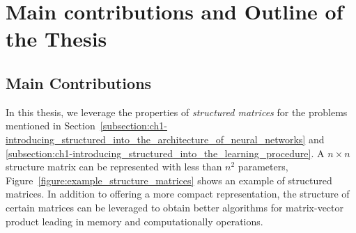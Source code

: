 \section{Main contributions and Outline of the Thesis}
\label{section:ch1-main_contributions_and_outline_of_the_thesis}

\subsection{Main Contributions}
\label{subsection:ch1-main_contributions}

In this thesis, we leverage the properties of \emph{structured matrices} for the problems mentioned in Section~\ref{subsection:ch1-introducing_structured_into_the_architecture_of_neural_networks} and \ref{subsection:ch1-introducing_structured_into_the_learning_procedure}. A $n \times n$ structure matrix can be represented with less than $n^2$ parameters, Figure~\ref{figure:example_structure_matrices} shows an example of structured matrices.
In addition to offering a more compact representation, the structure of certain matrices can be leveraged to obtain better algorithms for matrix-vector product leading in memory and computationally operations. 

